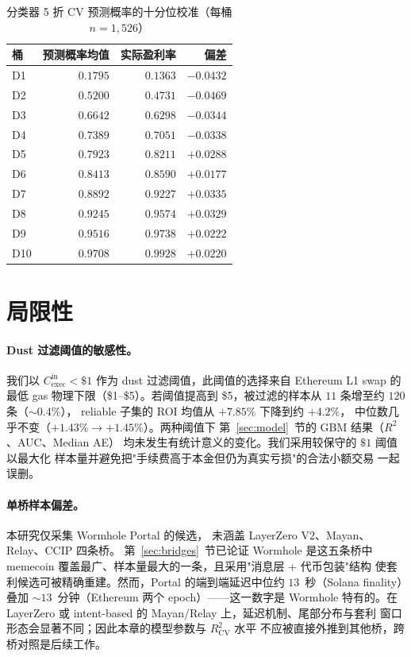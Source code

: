 \documentclass[sigconf,nonacm,10pt]{acmart}
\newcommand{\Cexec}{C_{\text{exec}}}
\begin{document}
\begin{table}[h]
  \centering
  \small
  \caption{分类器 5 折 CV 预测概率的十分位校准（每桶
  $n=1{,}526$）}
  \label{tab:calibration}
  \begin{tabular}{lrrr}
    \toprule
    \textbf{桶} & \textbf{预测概率均值} & \textbf{实际盈利率} & \textbf{偏差} \\
    \midrule
    D1  & $0.1795$ & $0.1363$ & $-0.0432$ \\
    D2  & $0.5200$ & $0.4731$ & $-0.0469$ \\
    D3  & $0.6642$ & $0.6298$ & $-0.0344$ \\
    D4  & $0.7389$ & $0.7051$ & $-0.0338$ \\
    D5  & $0.7923$ & $0.8211$ & $+0.0288$ \\
    D6  & $0.8413$ & $0.8590$ & $+0.0177$ \\
    D7  & $0.8892$ & $0.9227$ & $+0.0335$ \\
    D8  & $0.9245$ & $0.9574$ & $+0.0329$ \\
    D9  & $0.9516$ & $0.9738$ & $+0.0222$ \\
    D10 & $0.9708$ & $0.9928$ & $+0.0220$ \\
    \bottomrule
  \end{tabular}
\end{table}

\section{局限性}
\label{sec:limitations}

\paragraph{Dust 过滤阈值的敏感性。} 我们以
$\Cexec^{\text{in}}<\$1$ 作为 dust 过滤阈值，此阈值的选择来自
Ethereum L1 swap 的最低 gas 物理下限（\$1--\$5）。若阈值提高到
\$5，被过滤的样本从 $11$ 条增至约 $120$ 条（$\sim0.4\%$），
reliable 子集的 ROI 均值从 $+7.85\%$ 下降到约 $+4.2\%$，
中位数几乎不变（$+1.43\%\to+1.45\%$）。两种阈值下
第~\ref{sec:model}~节的 GBM 结果（$R^2$、AUC、Median AE）
均未发生有统计意义的变化。我们采用较保守的 $\$1$ 阈值以最大化
样本量并避免把"手续费高于本金但仍为真实亏损"的合法小额交易
一起误删。

\paragraph{单桥样本偏差。} 本研究仅采集 Wormhole Portal 的候选，
未涵盖 LayerZero V2、Mayan、Relay、CCIP 四条桥。
第~\ref{sec:bridges}~节已论证 Wormhole 是这五条桥中 memecoin
覆盖最广、样本量最大的一条，且采用"消息层 + 代币包装"结构
使套利候选可被精确重建。然而，Portal 的端到端延迟中位约
$13$~秒（Solana finality）叠加 $\sim13$~分钟（Ethereum 两个
epoch）——这一数字是 Wormhole 特有的。在 LayerZero 或
intent-based 的 Mayan/Relay 上，延迟机制、尾部分布与套利
窗口形态会显著不同；因此本章的模型参数与 $R^2_{\text{CV}}$ 水平
不应被直接外推到其他桥，跨桥对照是后续工作。
\end{document}
